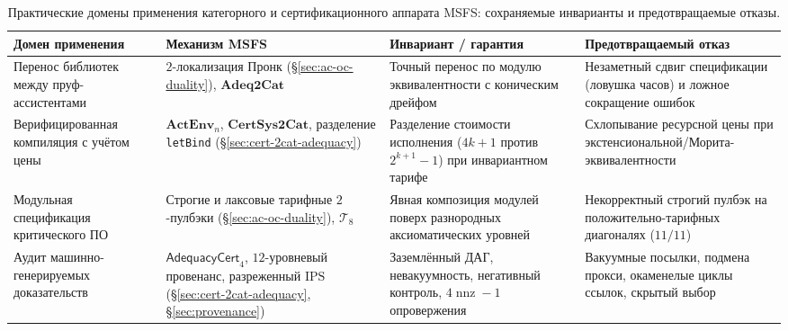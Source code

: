 \documentclass[11pt]{article}
\theoremstyle{plain}
\theoremstyle{definition}
\begin{document}
\begin{table}[ht]
\centering
\caption{Практические домены применения категорного и сертификационного аппарата MSFS: сохраняемые инварианты и предотвращаемые отказы.}
\label{tab:domain-applications}
\footnotesize
\begin{tabular}{@{}>{\RaggedRight\arraybackslash}p{2.9cm} >{\RaggedRight\arraybackslash}p{3.4cm} >{\RaggedRight\arraybackslash}p{3.9cm} >{\RaggedRight\arraybackslash}p{4.2cm}@{}}
\toprule
\textbf{Домен применения} & \textbf{Механизм MSFS} & \textbf{Инвариант / гарантия} & \textbf{Предотвращаемый отказ} \\ \midrule
Перенос библиотек между пруф-ассистентами & $2$-локализация Пронк (\S\ref{sec:ac-oc-duality}), $\mathbf{Adeq2Cat}$ & Точный перенос по модулю эквивалентности с коническим дрейфом & Незаметный сдвиг спецификации (ловушка часов) и ложное сокращение ошибок \\ \addlinespace[3pt]
Верифицированная компиляция с учётом цены & $\mathbf{ActEnv}_n$, $\mathbf{CertSys2Cat}$, разделение \texttt{letBind} (\S\ref{sec:cert-2cat-adequacy}) & Разделение стоимости исполнения ($4k+1$ против $2^{k+1}-1$) при инвариантном тарифе & Схлопывание ресурсной цены при экстенсиональной/Морита-эквивалентности \\ \addlinespace[3pt]
Модульная спецификация критического ПО & Строгие и лаксовые тарифные $2$-пулбэки (\S\ref{sec:ac-oc-duality}), $\mathcal{T}_8$ & Явная композиция модулей поверх разнородных аксиоматических уровней & Некорректный строгий пулбэк на положительно-тарифных диагоналях ($11/11$) \\ \addlinespace[3pt]
Аудит машинно-генерируемых доказательств & $\mathsf{AdequacyCert}_4$, $12$-уровневый провенанс, разреженный $\mathrm{IPS}$ (\S\ref{sec:cert-2cat-adequacy}, \S\ref{sec:provenance}) & Заземлённый ДАГ, невакуумность, негативный контроль, $4\operatorname{nnz}-1$ опровержения & Вакуумные посылки, подмена прокси, окаменелые циклы ссылок, скрытый выбор \\ \bottomrule
\end{tabular}
\end{table}
\end{document}
